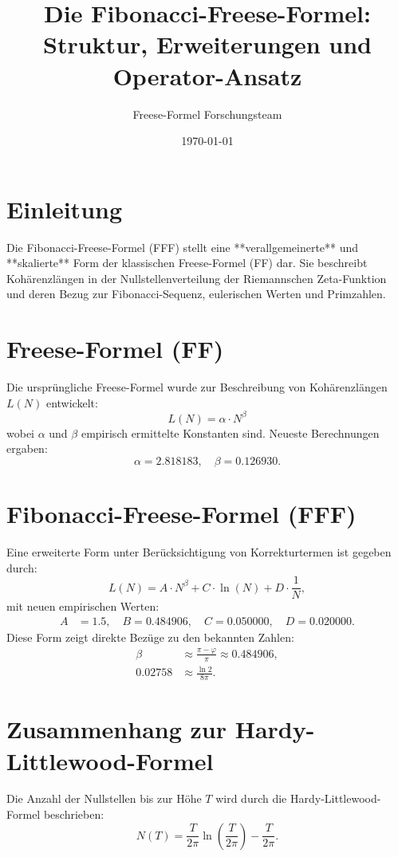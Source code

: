 \documentclass[a4paper,12pt]{article}
\title{Die Fibonacci-Freese-Formel: Struktur, Erweiterungen und Operator-Ansatz}
\author{Freese-Formel Forschungsteam}
\date{\today}
\begin{document}
\maketitle

\section{Einleitung}
Die Fibonacci-Freese-Formel (FFF) stellt eine **verallgemeinerte** und **skalierte** Form der klassischen Freese-Formel (FF) dar. Sie beschreibt Kohärenzlängen in der Nullstellenverteilung der Riemannschen Zeta-Funktion und deren Bezug zur Fibonacci-Sequenz, eulerischen Werten und Primzahlen.

\section{Freese-Formel (FF)}
Die ursprüngliche Freese-Formel wurde zur Beschreibung von Kohärenzlängen \( L(N) \) entwickelt:
\begin{equation}
L(N) = \alpha \cdot N^\beta
\end{equation}
wobei \( \alpha \) und \( \beta \) empirisch ermittelte Konstanten sind. Neueste Berechnungen ergaben:
\begin{equation}
\alpha = 2.818183, \quad \beta = 0.126930.
\end{equation}

\section{Fibonacci-Freese-Formel (FFF)}
Eine erweiterte Form unter Berücksichtigung von Korrekturtermen ist gegeben durch:
\begin{equation}
L(N) = A \cdot N^\beta + C \cdot \ln(N) + D \cdot \frac{1}{N},
\end{equation}
mit neuen empirischen Werten:
\begin{align}
A &= 1.5, \quad B = 0.484906, \quad C = 0.050000, \quad D = 0.020000.
\end{align}
Diese Form zeigt direkte Bezüge zu den bekannten Zahlen:
\begin{align}
\beta &\approx \frac{\pi - \varphi}{\pi} \approx 0.484906, \\
0.02758 &\approx \frac{\ln 2}{8\pi}.
\end{align}

\section{Zusammenhang zur Hardy-Littlewood-Formel}
Die Anzahl der Nullstellen bis zur Höhe \( T \) wird durch die Hardy-Littlewood-Formel beschrieben:
\begin{equation}
N(T) = \frac{T}{2\pi} \ln \left( \frac{T}{2\pi} \right) - \frac{T}{2\pi}.
\end{equation}
\end{document}
